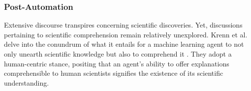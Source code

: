 
\subsubsection{Post-Automation}


Extensive discourse transpires concerning scientific discoveries. Yet, discussions pertaining to scientific comprehension remain relatively unexplored. Krenn et al. delve into the conundrum of what it entails for a machine learning agent to not only unearth scientific knowledge but also to comprehend it \cite{krenn2022scientific}. They adopt a human-centric stance, positing that an agent's ability to offer explanations comprehensible to human scientists signifies the existence of its scientific understanding.


